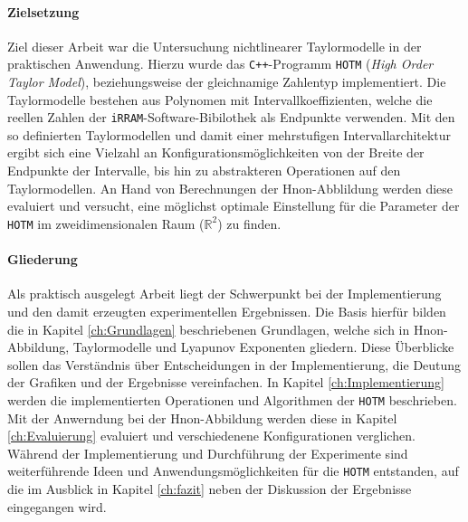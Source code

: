 \paragraph{Zielsetzung}

Ziel dieser Arbeit war die Untersuchung nichtlinearer Taylormodelle in der praktischen Anwendung. Hierzu wurde das \verb.C++.-Programm \verb+HOTM+ (\textit{High Order Taylor Model}), beziehungsweise der gleichnamige Zahlentyp implementiert. Die Taylormodelle bestehen aus Polynomen mit Intervallkoeffizienten, welche die reellen Zahlen der \verb+iRRAM+-Software-Bibilothek als Endpunkte verwenden. Mit den so definierten Taylormodellen und damit einer mehrstufigen Intervallarchitektur ergibt sich eine Vielzahl an Konfigurationsmöglichkeiten von der Breite der Endpunkte der Intervalle, bis hin zu abstrakteren Operationen auf den Taylormodellen. An Hand von Berechnungen der H\e non-Abblildung werden diese evaluiert und versucht, eine möglichst optimale Einstellung für die Parameter der \verb+HOTM+ im zweidimensionalen Raum ($\mathbb{R}^2$) zu finden.

\paragraph{Gliederung}

Als praktisch ausgelegt Arbeit liegt der Schwerpunkt bei der Implementierung und den damit erzeugten experimentellen Ergebnissen. Die Basis hierfür bilden die in Kapitel \ref{ch:Grundlagen} beschriebenen Grundlagen, welche sich in H\e non-Abbildung, Taylormodelle und Lyapunov Exponenten gliedern. Diese Überblicke sollen das Verständnis über Entscheidungen in der Implementierung, die Deutung der Grafiken und der Ergebnisse vereinfachen. In Kapitel \ref{ch:Implementierung} werden die implementierten Operationen und Algorithmen der \verb+HOTM+ beschrieben. Mit der Anwerndung bei der H\e non-Abbildung werden diese in Kapitel \ref{ch:Evaluierung} evaluiert und verschiedenene Konfigurationen verglichen. Während der Implementierung und Durchführung der Experimente sind weiterführende Ideen und Anwendungsmöglichkeiten für die \verb+HOTM+ entstanden, auf die im Ausblick in Kapitel \ref{ch:fazit} neben der Diskussion der Ergebnisse eingegangen wird.

